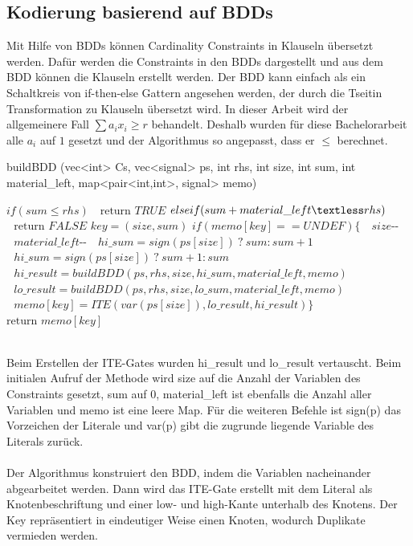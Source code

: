 \documentclass[a4,abstract=on]{scrartcl}
\begin{document}
	\subsection{Kodierung basierend auf BDDs}
Mit Hilfe von BDDs \cite[vgl.][]{bddkod} können Cardinality Constraints in Klauseln übersetzt werden. Dafür werden die Constraints in den BDDs dargestellt und aus dem BDD können die Klauseln erstellt werden. Der BDD kann einfach als ein Schaltkreis von if-then-else Gattern angesehen werden, der durch die Tseitin Transformation zu Klauseln übersetzt wird. In dieser Arbeit \cite[][Seite 11]{niklasse} wird der allgemeinere Fall $\sum a_i x_i \geq r$ behandelt. Deshalb wurden für diese Bachelorarbeit alle $a_i$ auf $1$ gesetzt und der Algorithmus so angepasst, dass er $\leq$ berechnet.

\begin{algorithm}
\caption{buildBDD (vec<int> Cs, vec<signal> ps, int rhs, int size, int sum, int material\_left, map<pair<int,int>, signal> memo)}
\label{alg:buildBDD}
\begin{algorithmic}

\State $\text{}if (sum \leq rhs)$
\State $\text{~~return } TRUE$
\State $\text{}else if (sum + material\_left \textless rhs)$
\State $\text{~~return } FALSE$
\State $\text{} key = (size, sum)$
\State $\text{}if (memo[key] == UNDEF) \{$
\State $\text{~~} size\text{-{}-}$
\State $\text{~~} material\_left \text{-{}-}$
\State $\text{~~} hi\_sum = sign(ps[size]) {~} ? {~} sum : sum + 1$
\State $\text{~~} hi\_sum = sign(ps[size]) {~} ? {~} sum + 1 : sum$
\State $\text{~~} hi\_result = buildBDD(ps , rhs, size, hi\_sum, material\_left, memo)$
\State $\text{~~} lo\_result = buildBDD(ps , rhs, size, lo\_sum, material\_left, memo)$
\State $\text{~~} memo[key] = ITE(var(ps[size]), lo\_result, hi\_result)\}$
\State $\text{return }memo[key]$
\end{algorithmic}
\end{algorithm}
\ \\
Beim Erstellen der ITE-Gates wurden hi\_result und lo\_result vertauscht. Beim initialen Aufruf der Methode wird size auf die Anzahl der Variablen des Constraints gesetzt, sum auf $0$, material\_left ist ebenfalls die Anzahl aller Variablen und memo ist eine leere Map. Für die weiteren Befehle ist sign(p) das Vorzeichen der Literale und var(p) gibt die zugrunde liegende Variable des Literals zurück.\\
\ \\
Der Algorithmus konstruiert den BDD, indem die Variablen nacheinander abgearbeitet werden. Dann wird das ITE-Gate erstellt mit dem Literal als Knotenbeschriftung und einer low- und high-Kante unterhalb des Knotens. Der Key repräsentiert in eindeutiger Weise einen Knoten, wodurch Duplikate vermieden werden.\\
\end{document}

